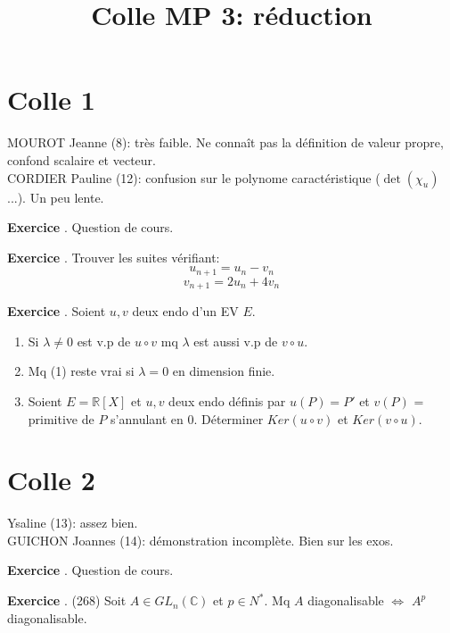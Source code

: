 \documentclass[10pt,a4paper]{article}
\title{Colle MP 3: réduction}
\newcounter{question}
\newcounter{exo}
\newenvironment{exo}{\vspace{0.5cm}\setcounter{question}{0}\addtocounter{exo}{1} \noindent \textbf{Exercice \theexo}. \normalsize }{\par}
\begin{document}
	\maketitle
	
	\section*{Colle 1}
	MOUROT Jeanne (8): très faible. Ne connaît pas la définition de valeur propre, confond scalaire et vecteur.\\
	CORDIER Pauline (12): confusion sur le polynome caractéristique ($\det(\chi_u)$...). Un peu lente.\\
	
	\begin{exo}
		Question de cours.
	\end{exo}
	
	\begin{exo}
		Trouver les suites vérifiant:
		$$u_{n+1} = u_n - v_n$$
		$$v_{n+1} = 2u_n + 4v_n$$
	\end{exo}

	\begin{exo}
		Soient $u, v$ deux endo d'un EV $E$.
		\begin{enumerate}
			\item Si $\lambda \neq 0$ est v.p de $u \circ v$ mq $\lambda$ est aussi v.p de $v \circ u$.
			\item Mq (1) reste vrai si $\lambda = 0$ en dimension finie.
			\item Soient $E =\mathbb{R}[X]$ et $u, v$ deux endo définis par $u(P) = P'$ et $v(P)$ = primitive de $P$ s'annulant en 0.
			Déterminer $Ker(u \circ v)$ et $Ker(v \circ u)$.
		\end{enumerate}
	\end{exo}
	
	
	\section*{Colle 2}
	\setcounter{exo}{0}
	Ysaline (13): assez bien. \\
	GUICHON Joannes (14): démonstration incomplète. Bien sur les exos.\\
	
	\begin{exo}
		Question de cours.
	\end{exo}

	\begin{exo} (268)
		Soit $A \in GL_n(\mathbb{C})$ et $p \in N^*$. Mq $A$ diagonalisable $\Longleftrightarrow$ $A^p$ diagonalisable.
	\end{exo}
	
\end{document}
